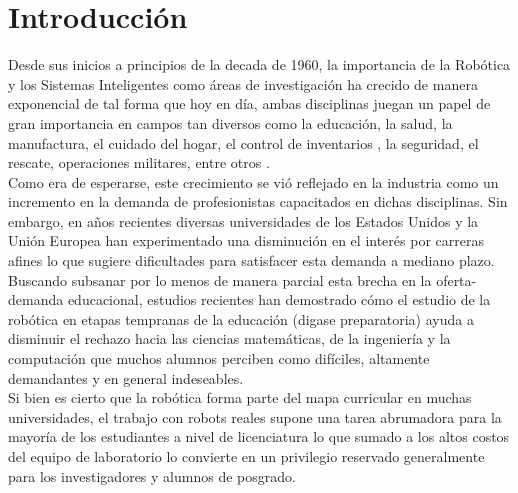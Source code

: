 \documentclass[letterpaper,openright,12pt]{book}
\begin{document}
\tableofcontents %
\newpage

\listoffigures 




\underline{\underline{}}\chapter{Introducción}

Desde sus inicios a principios de la decada de 1960, la importancia de la Robótica y los Sistemas Inteligentes como áreas de investigación ha crecido de manera exponencial de tal forma que hoy en día, ambas disciplinas juegan un papel de gran importancia en campos tan diversos como la educación, la salud, la manufactura, el cuidado del hogar, el control de inventarios , la seguridad, el rescate, operaciones militares, entre otros \cite{lazinica}.\\
Como era de esperarse, este crecimiento se vió reflejado en la industria como un incremento en la demanda de profesionistas capacitados en dichas disciplinas\cite{stites}. Sin embargo, en años recientes diversas universidades de los Estados Unidos y la Unión Europea han experimentado una disminución en el interés por carreras afines \cite{vegso}\cite{davidson} lo que sugiere  dificultades para satisfacer esta demanda a mediano plazo.\\
Buscando subsanar por lo menos de manera parcial esta brecha en la oferta-demanda educacional, estudios recientes han demostrado cómo el estudio de la robótica en etapas tempranas de la educación (digase preparatoria) ayuda a disminuir el rechazo hacia las ciencias matemáticas, de la ingeniería y la computación que muchos alumnos perciben como difíciles, altamente demandantes y en general indeseables\cite{salamon}.\\
Si bien es cierto que la robótica forma parte del mapa curricular en muchas universidades, el trabajo con robots reales supone una tarea abrumadora para la mayoría de los estudiantes a nivel de licenciatura lo que sumado a los altos costos del equipo de laboratorio lo convierte en un privilegio reservado generalmente para los investigadores y alumnos de posgrado\cite{challinger}.\\
\end{document}
